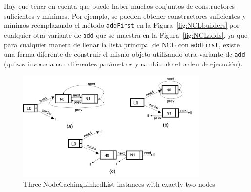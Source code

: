 Hay que tener en cuenta que puede haber muchos conjuntos de constructores suficientes y mínimos. Por ejemplo, se pueden obtener constructores suficientes y mínimos reemplazando el método \texttt{addFirst} en la Figura~\ref{fig:NCLbuilders} por cualquier otra variante de \texttt{add} que se muestra en la Figura~\ref{fig:NCLadds}, ya que para cualquier manera de llenar la lista principal de NCL con \texttt{addFirst}, existe una forma diferente de construir el mismo objeto utilizando otra variante de \texttt{add} (quizás invocada con diferentes parámetros y cambiando el orden de ejecución).



\begin{figure}[thb]
    \centering
    \includegraphics[width=0.85\textwidth]{NCL-instances.png}
    \caption{Three NodeCachingLinkedList instances with exactly two nodes}
    \label{fig:ncl-instances}
\end{figure}


